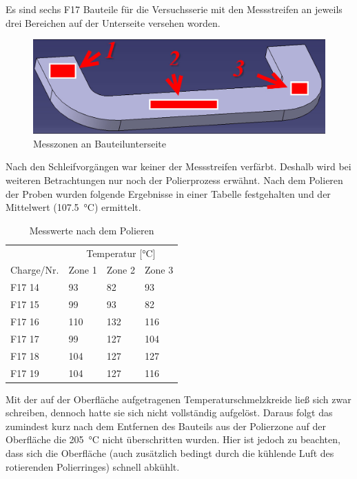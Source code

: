 \documentclass[12pt,a4paper,parskip,twoside,BCOR5mm,headsepline]{scrartcl}
\begin{document}
Es sind sechs F17 Bauteile für die Versuchsserie mit den Messstreifen an jeweils drei Bereichen auf der Unterseite versehen worden.
\begin{figure}[H]
\centering
\includegraphics[width=.8\textwidth]{messbereicheVDKDunterseite}
\caption{Messzonen an Bauteilunterseite}
\label{messzonen}
\end{figure}

Nach den Schleifvorgängen war keiner der Messstreifen verfärbt. Deshalb wird bei weiteren Betrachtungen nur noch der Polierprozess erwähnt. Nach dem Polieren der Proben wurden folgende Ergebnisse in einer Tabelle festgehalten und der Mittelwert (\SI{107.5}{\degreeCelsius}) ermittelt.



\begin{table}[H]
\caption{Messwerte nach dem Polieren}
\label{tab:messwerte}
\centering
\begin{tabular}{llll}
\toprule
              & \multicolumn{3}{c}{Temperatur [\si{\degreeCelsius}]}\\
              \cmidrule(ll){2-4}
 Charge/Nr. & Zone 1 & Zone 2 & Zone 3 \\
 \midrule
 F17 14 & 93 & 82 & 93 \\
 F17 15 & 99 & 93 & 82 \\
 F17 16 & 110 & 132 & 116 \\
 F17 17 & 99 & 127 & 104 \\
 F17 18 & 104 & 127 & 127 \\
 F17 19 & 104 & 127 & 116 \\
 \bottomrule             
\end{tabular}
\end{table}

Mit der auf der Oberfläche aufgetragenen Temperaturschmelzkreide ließ sich zwar schreiben, dennoch hatte sie sich nicht vollständig aufgelöst. Daraus folgt das zumindest kurz nach dem Entfernen des Bauteils aus der Polierzone auf der Oberfläche die \SI{205}{\degreeCelsius} nicht überschritten wurden. Hier ist jedoch zu beachten,  dass sich die Oberfläche (auch zusätzlich bedingt durch die kühlende Luft des rotierenden Polierringes) schnell abkühlt.
\end{document}
